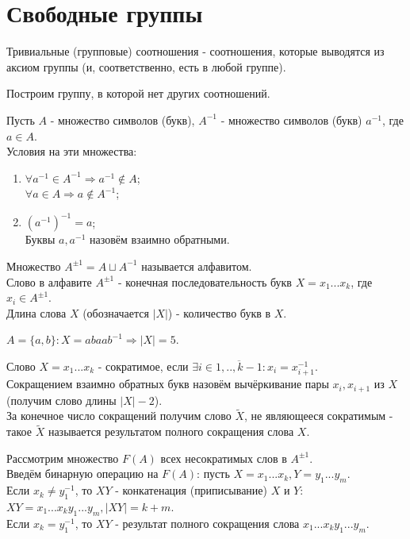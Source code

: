 \section{Свободные группы}
\begin{definition}
    Тривиальные (групповые) соотношения - соотношения, которые выводятся из аксиом группы (и, соответственно, есть в любой группе).
\end{definition}
Построим группу, в которой нет других соотношений.
\begin{definition}
    Пусть $A$ - множество символов (букв), $A^{-1}$ - множество символов (букв) $a^{-1}$, где $a \in A$.\\
    Условия на эти множества:
    \begin{enumerate}
        \item $\forall a^{-1} \in A^{-1} \Longrightarrow a^{-1} \notin A$;\\
        $\forall a \in A \Longrightarrow a \notin A^{-1}$;
        \item $(a^{-1})^{-1} = a$;\\
        Буквы $a, a^{-1}$ назовём взаимно обратными.
    \end{enumerate}
Множество $A^{\pm 1} = A \sqcup A^{-1}$ называется алфавитом.\\
Слово в алфавите $A^{\pm 1}$ - конечная последовательность букв $X = x_1...x_k$, где $x_i \in A^{\pm 1}$.\\
Длина слова $X$ (обозначается $|X|$) - количество букв в $X$.
\end{definition}
\begin{example}
    $A = \{a, b\}: X = abaab^{-1} \Rightarrow |X| = 5$.
\end{example} 
\begin{definition}
    Слово $X = x_1...x_k$ - сократимое, если $\exists i \in \overline{1,..,k-1}: x_i = x^{-1}_{i+1}$.\\
    Сокращением взаимно обратных букв назовём вычёркивание пары $x_i, x_{i+1}$ из $X$ (получим слово длины $|X| - 2$).\\
    За конечное число сокращений получим слово $\tilde{X}$, не являющееся сократимым - такое $\tilde{X}$ называется результатом полного сокращения слова $X$.
\end{definition}
\begin{definition}
    Рассмотрим множество $F(A)$ всех несократимых слов в $A^{\pm 1}$.\\
    Введём бинарную операцию на $F(A)$: пусть $X = x_1...x_k, Y = y_1...y_m$.\\
    Если $x_k \neq y_1^{-1}$, то $XY$ - конкатенация (приписывание) $X$ и $Y$:\\
    $XY = x_1...x_ky_1...y_m, |XY| = k+m$.\\
    Если $x_k = y_1^{-1}$, то $XY$ - результат полного сокращения слова $x_1...x_ky_1...y_m$.
\end{definition}
